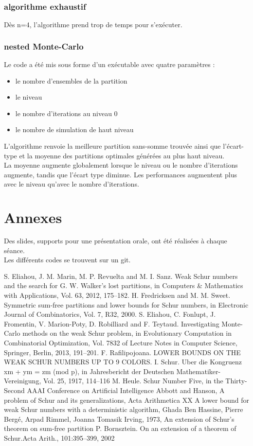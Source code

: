 \documentclass{report}
\begin{document}
\subsubsection{algorithme exhaustif}
Dès n=4, l'algorithme prend trop de temps pour s'exécuter.
\subsubsection{nested Monte-Carlo}
Le code a été mis sous forme d'un exécutable avec quatre paramètres : 
\begin{itemize}
    \item le nombre d'ensembles de la partition
    \item le niveau
    \item le nombre d’iterations au niveau 0
    \item le nombre de simulation de haut niveau
\end{itemize}
 L'algorithme renvoie la meilleure partition sans-somme trouvée ainsi que l'écart-type et la moyenne des partitions optimales générées au plus haut niveau. 
 \\ La moyenne augmente globalement lorsque le niveau ou le nombre d’iterations augmente, tandis que l'écart type diminue. Les performances augmentent plus avec le niveau qu'avec le nombre d’iterations.

\section{Annexes}
Des slides, supports pour une présentation orale, ont été réalisées à chaque séance.
\\ Les différents codes se trouvent sur un git.

\begin{thebibliography}{}
 S. Eliahou, J. M. Marin, M. P. Revuelta and M. I. Sanz. Weak Schur numbers and the search for G. W. Walker’s lost partitions, in Computers & Mathematics with Applications, Vol. 63, 2012, 175–182.
 H. Fredricksen and M. M. Sweet. Symmetric sum-free partitions and lower bounds for Schur numbers, in Electronic Journal of Combinatorics, Vol. 7, R32, 2000.
  S. Eliahou, C. Fonlupt, J. Fromentin, V. Marion-Poty, D. Robilliard and F. Teytaud. Investigating Monte-Carlo methods on the weak Schur problem, in Evolutionary Computation in Combinatorial Optimization, Vol. 7832 of Lecture Notes in Computer Science, Springer, Berlin, 2013, 191–201.
 F. Rafilipojoana. LOWER BOUNDS ON THE WEAK SCHUR NUMBERS UP TO 9 COLORS.
  I. Schur. Uber die Kongruenz xm + ym = zm (mod p), in Jahresbericht der Deutschen Mathematiker-Vereinigung, Vol. 25, 1917, 114–116
 M. Heule. Schur Number Five, in the Thirty-Second AAAI Conference on Artificial Intelligence 
 Abbott and Hanson, A problem of Schur and its generalizations, Acta Arithmetica XX
 A lower bound for weak Schur numbers with a deterministic algorithm, Ghada Ben Hassine, Pierre Bergé, Arpad Rimmel, Joanna Tomasik
 Irving, 1973, An extension of Schur’s theorem on sum-free partition
 P. Bornsztein. On an extension of a theorem of Schur.Acta Arith., 101:395–399, 2002
\end{thebibliography}
\end{document}
